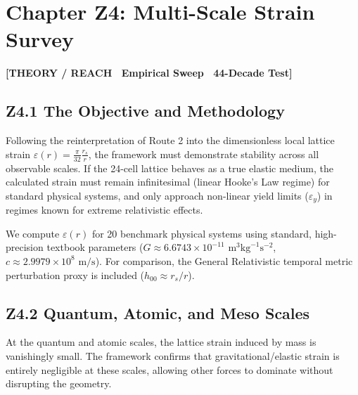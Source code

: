 \documentclass[11pt, letterpaper, openany]{book}
\begin{document}
\section*{Chapter Z4: Multi-Scale Strain Survey}

\begin{center}
{\color{theorytag}\textbf{[THEORY / REACH \textbullet\ Empirical Sweep \textbullet\ 44-Decade Test]}}
\end{center}

\subsection*{Z4.1 The Objective and Methodology}

Following the reinterpretation of Route 2 into the dimensionless local lattice strain $\varepsilon(r) = \frac{\pi}{32}\frac{r_s}{r}$, the framework must demonstrate stability across all observable scales. If the 24-cell lattice behaves as a true elastic medium, the calculated strain must remain infinitesimal (linear Hooke's Law regime) for standard physical systems, and only approach non-linear yield limits ($\varepsilon_y$) in regimes known for extreme relativistic effects.

We compute $\varepsilon(r)$ for 20 benchmark physical systems using standard, high-precision textbook parameters ($G \approx 6.6743 \times 10^{-11} \text{ m}^3 \text{kg}^{-1} \text{s}^{-2}$, $c \approx 2.9979 \times 10^8 \text{ m/s}$). For comparison, the General Relativistic temporal metric perturbation proxy is included ($h_{00} \approx r_s/r$).

\subsection*{Z4.2 Quantum, Atomic, and Meso Scales}

At the quantum and atomic scales, the lattice strain induced by mass is vanishingly small. The framework confirms that gravitational/elastic strain is entirely negligible at these scales, allowing other forces to dominate without disrupting the geometry.
\end{document}
